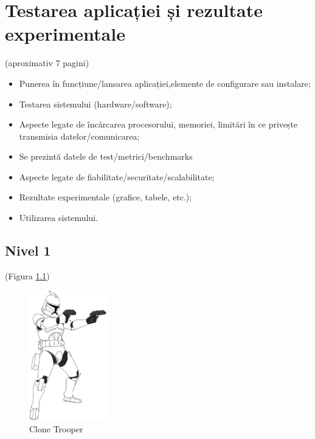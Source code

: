 \chapter{Testarea aplicației și rezultate experimentale}
\label{cap:cap4}

(aproximativ 7 pagini)

\begin{itemize}
    \item Punerea în funcțiune/lansarea aplicației,elemente de configurare sau instalare;
    \item Testarea sistemului (hardware/software);
    \item Aspecte legate de încărcarea procesorului, memoriei, limitări în ce privește transmisia datelor/comunicarea;
    \item Se prezintă datele de test/metrici/benchmarks
    \item Aspecte legate de fiabilitate/securitate/scalabilitate;
    \item Rezultate experimentale (grafice, tabele, etc.);
    \item Utilizarea sistemului. 
\end{itemize}

\section{Nivel 1}
\label{cap:cap4:nivel1}

\textcolor{gray}{\lipsum}  (Figura \ref{fig:clone_trooper})

\begin{figure}[H]
    \centering
    \includegraphics[width=0.3\textwidth]{continut/capitol4/figuri/clone_trooper.png}
    \caption{Clone Trooper\protect\footnotemark}
    \label{fig:clone_trooper}
\end{figure}

